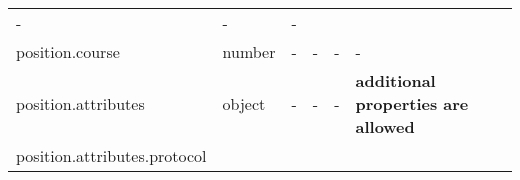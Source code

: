 \documentclass[
]{article}
\begin{document}
\begin{longtable}[]{@{}llllll@{}}
\begin{minipage}[t]{0.14\columnwidth}
-\strut
\end{minipage} & \begin{minipage}[t]{0.14\columnwidth}\raggedright
-\strut
\end{minipage} & \begin{minipage}[t]{0.14\columnwidth}\raggedright
-\strut
\end{minipage}\tabularnewline
\begin{minipage}[t]{0.14\columnwidth}\raggedright
position.course\strut
\end{minipage} & \begin{minipage}[t]{0.14\columnwidth}\raggedright
number\strut
\end{minipage} & \begin{minipage}[t]{0.14\columnwidth}\raggedright
-\strut
\end{minipage} & \begin{minipage}[t]{0.14\columnwidth}\raggedright
-\strut
\end{minipage} & \begin{minipage}[t]{0.14\columnwidth}\raggedright
-\strut
\end{minipage} & \begin{minipage}[t]{0.14\columnwidth}\raggedright
-\strut
\end{minipage}\tabularnewline
\begin{minipage}[t]{0.14\columnwidth}\raggedright
position.attributes\strut
\end{minipage} & \begin{minipage}[t]{0.14\columnwidth}\raggedright
object\strut
\end{minipage} & \begin{minipage}[t]{0.14\columnwidth}\raggedright
-\strut
\end{minipage} & \begin{minipage}[t]{0.14\columnwidth}\raggedright
-\strut
\end{minipage} & \begin{minipage}[t]{0.14\columnwidth}\raggedright
-\strut
\end{minipage} & \begin{minipage}[t]{0.14\columnwidth}\raggedright
\textbf{additional properties are allowed}\strut
\end{minipage}\tabularnewline
\begin{minipage}[t]{0.14\columnwidth}\raggedright
position.attributes.protocol\strut
\end{minipage} & \begin{minipage}[t]{0.14\columnwidth}\raggedright

\end{minipage}
\end{longtable}
\end{document}
